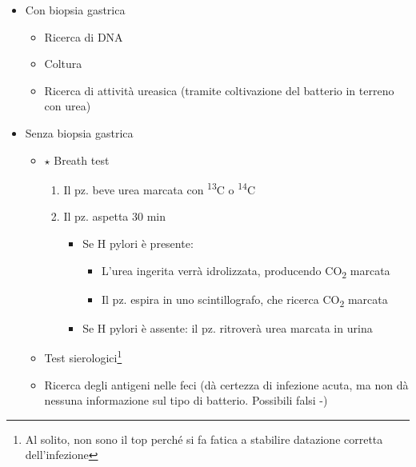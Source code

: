 \documentclass[italian,]{article}
\providecommand{\tightlist}{%
  \setlength{\itemsep}{0pt}\setlength{\parskip}{0pt}}
\newcommand{\goldstandard}{\textcircled{$\star$} }                      %
\begin{document}
\begin{itemize}
\tightlist
\item
  Con biopsia gastrica

  \begin{itemize}
  \tightlist
  \item
    Ricerca di DNA
  \item
    Coltura
  \item
    Ricerca di attività ureasica (tramite coltivazione del batterio in
    terreno con urea)
  \end{itemize}
\item
  Senza biopsia gastrica

  \begin{itemize}
  \tightlist
  \item
    \goldstandard Breath test

    \begin{enumerate}
    \def\labelenumi{\arabic{enumi}.}
    \tightlist
    \item
      Il pz. beve urea marcata con \textsuperscript{13}C o
      \textsuperscript{14}C
    \item
      Il pz. aspetta 30 min

      \begin{itemize}
      \tightlist
      \item
        Se H pylori è presente:

        \begin{itemize}
        \tightlist
        \item
          L'urea ingerita verrà idrolizzata, producendo
          CO\textsubscript{2} marcata
        \item
          Il pz. espira in uno scintillografo, che ricerca
          CO\textsubscript{2} marcata
        \end{itemize}
      \item
        Se H pylori è assente: il pz. ritroverà urea marcata in urina
      \end{itemize}
    \end{enumerate}
  \item
    Test sierologici\footnote{Al solito, non sono il top perché si fa
      fatica a stabilire datazione corretta dell'infezione}
  \item
    Ricerca degli antigeni nelle feci (dà certezza di infezione acuta,
    ma non dà nessuna informazione sul tipo di batterio. Possibili falsi
    -)
  \end{itemize}
\end{itemize}
\end{document}
